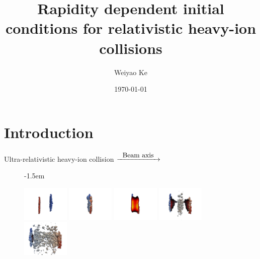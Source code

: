 \documentclass[11pt]{beamer}
\author{Weiyao Ke}
\title[Rapidity dependent IC for RHIC]{Rapidity dependent initial conditions for relativistic heavy-ion collisions}
\date{\today}
\begin{document}
\begin{frame}
\titlepage
\end{frame}


\begin{frame}[noframenumbering]
\tableofcontents
\end{frame}


\section{Introduction}
\begin{frame}{Ultra-relativistic heavy-ion collision}
$\xrightarrow{\makebox[2cm]{Beam axis}}$
    \begin{figure}
    \kern-1.5em
   	\begin{center}
	\includegraphics[width=0.2\textwidth]{pics/new1.png} 
	\includegraphics[width=0.2\textwidth]{pics/new50.png} 
	\includegraphics[width=0.2\textwidth]{pics/new100.png}	
	\includegraphics[width=0.2\textwidth]{pics/new230.png}  
	\includegraphics[width=0.2\textwidth]{pics/new300.png}  
	\end{center} 	
  	\end{figure}
  	\begin{center}

\end{center}
\end{frame}
\end{document}
